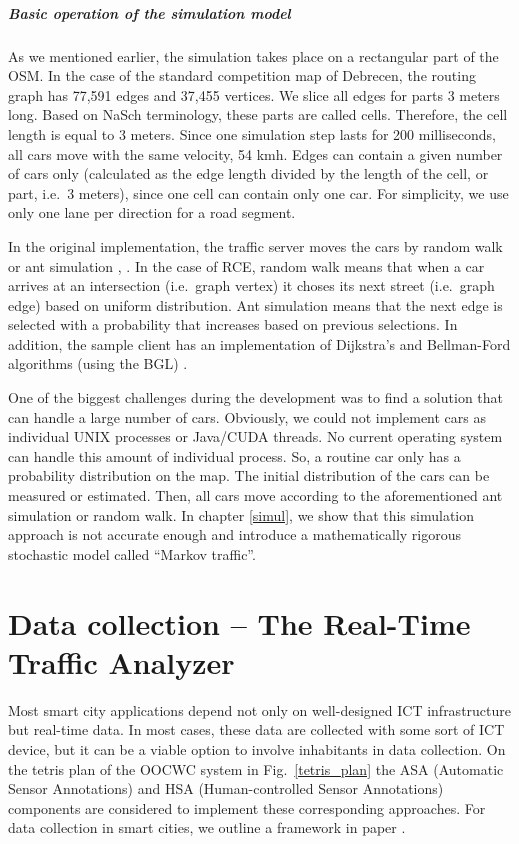 \documentclass[b5paper,12pt]{report}
\theoremstyle{definition}
\begin{document}
\paragraph{Basic operation of the simulation model}
As we mentioned earlier, the simulation takes place on a rectangular part of the OSM. In the case of the standard competition map of Debrecen, the routing graph has 77,591 edges and 37,455 vertices. We slice all edges for parts 3 meters long. Based on NaSch terminology, these parts are called cells. Therefore, the cell length is equal to 3 meters. Since one simulation step lasts for 200 milliseconds, all cars move with the same velocity, 54 kmh. Edges can contain a given number of cars only (calculated as the edge length divided by the length of the cell, or part, i.e.~3 meters), since one cell can contain only one car. For simplicity, we use only one lane per direction for a road segment.

In the original implementation, the traffic server moves the cars by random walk or ant simulation \cite{ant1}, \cite{ant2}. In the case of RCE, random walk means that when a car arrives at an intersection (i.e.~graph vertex) it choses its next street (i.e.~graph edge) based on uniform distribution. Ant simulation means that the next edge is selected with a probability that increases based on previous selections. In addition, the sample client has an implementation of Dijkstra's and Bellman-Ford algorithms (using the BGL) \cite{siek2002boost}.

One of the biggest challenges during the development was to find a solution that can handle a large number of cars. Obviously, we could not implement cars as individual UNIX processes or Java/CUDA threads. No current operating system can handle this amount of individual process. So, a routine car only has a probability distribution on the map. The initial distribution of the cars can be measured or estimated. Then, all cars move according to the aforementioned ant simulation or random walk. In chapter \ref{simul}, we show that this simulation approach is not accurate enough and introduce a mathematically rigorous stochastic model called \enquote{Markov traffic}.

\chapter{Data collection -- The Real-Time Traffic Analyzer}
\label{rtta-chapter}

Most smart city applications depend not only on well-designed ICT infrastructure but real-time data. In most cases, these data are collected with some sort of ICT device, but it can be a viable option to involve inhabitants in data collection. On the tetris plan of the OOCWC system in Fig.~\ref{tetris_plan} the ASA (Automatic Sensor Annotations) and HSA (Human-controlled Sensor Annotations) components are considered to implement these corresponding approaches. For data collection in smart cities, we outline a framework in paper \cite{szabo2013framework}. 
\end{document}
